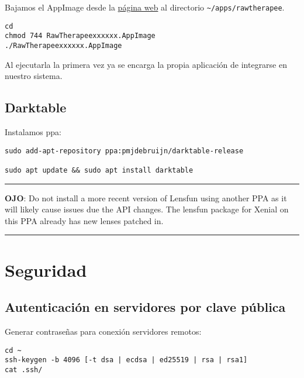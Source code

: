 \documentclass[
  12pt,
  spanish,
]{article}
\begin{document}
Bajamos el AppImage desde la \href{http://rawtherapee.com/}{página web}
al directorio \texttt{\textasciitilde{}/apps/rawtherapee}.

\begin{verbatim}
cd
chmod 744 RawTherapeexxxxxx.AppImage
./RawTherapeexxxxxx.AppImage
\end{verbatim}

Al ejecutarla la primera vez ya se encarga la propia aplicación de
integrarse en nuestro sistema.

\hypertarget{darktable}{%
\subsection{Darktable}\label{darktable}}

Instalamos ppa:

\begin{verbatim}
sudo add-apt-repository ppa:pmjdebruijn/darktable-release

sudo apt update && sudo apt install darktable
\end{verbatim}

\begin{center}\rule{0.5\linewidth}{\linethickness}\end{center}

\textbf{OJO}: Do not install a more recent version of Lensfun using
another PPA as it will likely cause issues due the API changes. The
lensfun package for Xenial on this PPA already has new lenses patched
in.

\begin{center}\rule{0.5\linewidth}{\linethickness}\end{center}

\hypertarget{seguridad}{%
\section{Seguridad}\label{seguridad}}

\hypertarget{autenticaciuxf3n-en-servidores-por-clave-puxfablica}{%
\subsection{Autenticación en servidores por clave
pública}\label{autenticaciuxf3n-en-servidores-por-clave-puxfablica}}

Generar contraseñas para conexión servidores remotos:

\begin{verbatim}
cd ~
ssh-keygen -b 4096 [-t dsa | ecdsa | ed25519 | rsa | rsa1]
cat .ssh/
\end{verbatim}
\end{document}
